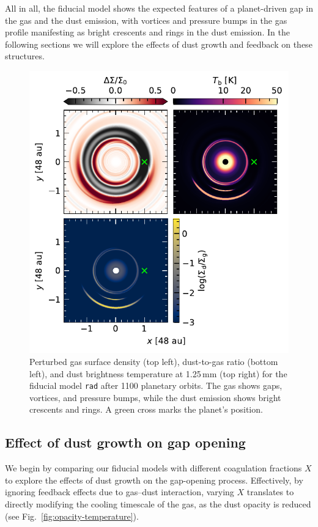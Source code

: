 \documentclass[fleqn,usenatbib,useAMS]{mnras}
\begin{document}
All in all, the fiducial model shows the expected features of a planet-driven gap in the gas and the dust emission, with vortices and pressure bumps in the gas profile manifesting as bright crescents and rings in the dust emission. In the following sections we will explore the effects of dust growth and feedback on these structures.
%
\begin{figure}
	\centering
	\includegraphics[width=\columnwidth]{fiducial-ext.pdf}
	\caption{Perturbed gas surface density (top left), dust-to-gas ratio (bottom left), and dust brightness temperature at 1.25\,mm (top right) for the fiducial model \texttt{rad} after 1100 planetary orbits. The gas shows gaps, vortices, and pressure bumps, while the dust emission shows bright crescents and rings. A green cross marks the planet's position.}
	\label{fig:fiducial-gas}
\end{figure}

\subsection{Effect of dust growth on gap opening}

We begin by comparing our fiducial models with different coagulation fractions $X$ to explore the effects of dust growth on the gap-opening process. Effectively, by ignoring feedback effects due to gas--dust interaction, varying $X$ translates to directly modifying the cooling timescale of the gas, as the dust opacity is reduced (see Fig.~\ref{fig:opacity-temperature}).
\end{document}
